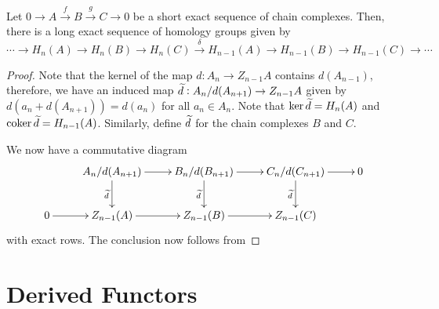 \begin{theorem}
    Let $0\to A\stackrel{f}{\longrightarrow}B\stackrel{g}{\longrightarrow}C\to 0$ be a short exact sequence of chain complexes. Then, there is a long exact sequence of homology groups given by 
    \begin{equation*}
        \cdots\to H_n(A)\to H_n(B)\to H_n(C)\stackrel{\delta}{\longrightarrow} H_{n - 1}(A)\to H_{n - 1}(B)\to H_{n - 1}(C)\to\cdots
    \end{equation*}
\end{theorem}
\begin{proof}
    Note that the kernel of the map $d: A_n\to Z_{n - 1}A$ contains $d(A_{n - 1})$, therefore, we have an induced map $\widetilde{d}: A_n/d(A_{n + 1})\to Z_{n - 1}A$ given by $d(a_n + d(A_{n + 1})) = d(a_n)$ for all $a_n\in A_n$. Note that $\ker\widetilde{d} = H_n(A)$ and $\operatorname{coker}\widetilde{d} = H_{n - 1}(A)$. Similarly, define $\widetilde{d}$ for the chain complexes $B$ and $C$. 

    We now have a commutative diagram
    \begin{equation*}
        \xymatrix {
            & A_n/d(A_{n + 1})\ar[r]\ar[d]_{\wt d} & B_n/d(B_{n + 1})\ar[r]\ar[d]_{\wt d} & C_n/d(C_{n + 1})\ar[r]\ar[d]_{\wt d} & 0\\
            0\ar[r] & Z_{n - 1}(A)\ar[r] & Z_{n - 1}(B)\ar[r] & Z_{n - 1}(C) & 
        }
    \end{equation*}
    with exact rows. The conclusion now follows from 
\end{proof}

\section{Derived Functors}